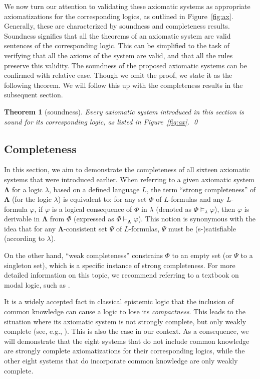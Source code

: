 \documentclass{article}
\newtheorem{theorem}{Theorem}
\renewcommand{\phi}{\varphi}
\begin{document}
We now turn our attention to validating these axiomatic systems as appropriate axiomatizations for the corresponding logics, as outlined in Figure~\ref{fig:ax}. Generally, these are characterized by soundness and completeness results. Soundness signifies that all the theorems of an axiomatic system are valid sentences of the corresponding logic. This can be simplified to the task of verifying that all the axioms of the system are valid, and that all the rules preserve this validity. The soundness of the proposed axiomatic systems can be confirmed with relative ease. Though we omit the proof, we state it as the following theorem. We will follow this up with the completeness results in the subsequent section.

\begin{theorem}[soundness]
Every axiomatic system introduced in this section is sound for its corresponding logic, as listed in Figure~\ref{fig:ax}.
\qed
\end{theorem}

\subsection{Completeness}\label{sec:completness}

In this section, we aim to demonstrate the completeness of all sixteen axiomatic systems that were introduced earlier. When referring to a given axiomatic system  $\mathbf{\Lambda}$ for a logic $\lambda$, based on a defined language $L$, the term ``strong completeness'' of $\mathbf{\Lambda}$ (for the logic $\lambda$) is equivalent to: for any set $\Phi$ of $L$-formulas and any $L$-formula $\phi$, if $\phi$ is a logical consequence of $\Phi$ in $\lambda$ (denoted as $\Phi \models_\lambda \phi$), then $\phi$ is derivable in $\mathbf{\Lambda}$ from $\Phi$ (expressed as $\Phi \vdash_{\mathbf{\Lambda}} \phi$). This notion is synonymous with the idea that for any $\mathbf{\Lambda}$-consistent set $\Psi$ of $L$-formulas, $\Psi$ must be (s-)satisfiable (according to $\lambda$).

On the other hand, ``weak completeness'' constrains $\Phi$ to an empty set (or $\Psi$ to a singleton set), which is a specific instance of strong completeness. For more detailed information on this topic, we recommend referring to a textbook on modal logic, such as \cite{BdRV2001}.

It is a widely accepted fact in classical epistemic logic that the inclusion of common knowledge can cause a logic to lose its \emph{compactness}. This leads to the situation where its axiomatic system is not strongly complete, but only weakly complete (see, e.g., \cite{BdRV2001,vDvdHK2008}). This is also the case in our context. As a consequence, we will demonstrate that the eight systems that do not include common knowledge are strongly complete axiomatizations for their corresponding logics, while the other eight systems that do incorporate common knowledge are only weakly complete.
\end{document}
